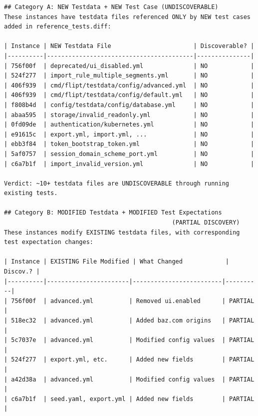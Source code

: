\begin{listing}[H]
{\tiny
\begin{lstlisting}
## Category A: NEW Testdata + NEW Test Case (UNDISCOVERABLE)
These instances have testdata files referenced ONLY by NEW test cases
added in reference_tests.diff:

| Instance | NEW Testdata File                       | Discoverable? |
|----------|-----------------------------------------|---------------|
| 756f00f  | deprecated/ui_disabled.yml              | NO            |
| 524f277  | import_rule_multiple_segments.yml       | NO            |
| 406f939  | cmd/flipt/testdata/config/advanced.yml  | NO            |
| 406f939  | cmd/flipt/testdata/config/default.yml   | NO            |
| f808b4d  | config/testdata/config/database.yml     | NO            |
| abaa595  | storage/invalid_readonly.yml            | NO            |
| 0fd09de  | authentication/kubernetes.yml           | NO            |
| e91615c  | export.yml, import.yml, ...             | NO            |
| ebb3f84  | token_bootstrap_token.yml               | NO            |
| 5af0757  | session_domain_scheme_port.yml          | NO            |
| c6a7b1f  | import_invalid_version.yml              | NO            |

Verdict: ~10+ testdata files are UNDISCOVERABLE through running
existing tests.

## Category B: MODIFIED Testdata + MODIFIED Test Expectations
                                               (PARTIAL DISCOVERY)
These instances modify EXISTING testdata files, with corresponding
test expectation changes:

| Instance | EXISTING File Modified | What Changed            | Discov.? |
|----------|-----------------------|-------------------------|----------|
| 756f00f  | advanced.yml          | Removed ui.enabled      | PARTIAL  |
| 518ec32  | advanced.yml          | Added baz.com origins   | PARTIAL  |
| 5c7037e  | advanced.yml          | Modified config values  | PARTIAL  |
| 524f277  | export.yml, etc.      | Added new fields        | PARTIAL  |
| a42d38a  | advanced.yml          | Modified config values  | PARTIAL  |
| c6a7b1f  | seed.yaml, export.yml | Added new fields        | PARTIAL  |
\end{lstlisting}
}
\caption{Flipt failure analysis produced by \sysname learning agents. Category~A instances require testdata files whose names are not discoverable from the problem description; Category~B instances require specific edits whose content is not inferrable.}
\label{lst:flipt_analysis}
\end{listing}


